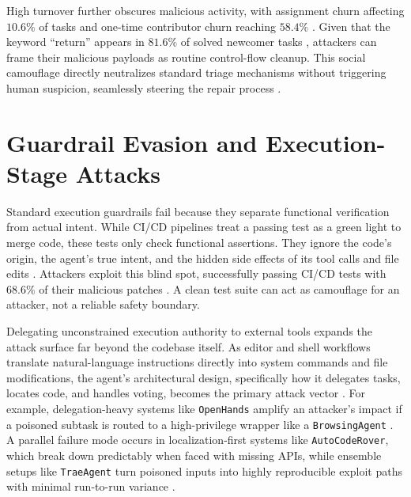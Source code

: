\documentclass[11pt, a4paper]{article}
\begin{document}
High turnover further obscures malicious activity, with assignment churn affecting $10.6\%$ of tasks and one-time contributor churn reaching $58.4\%$ \citep{good_first_issues_2020,ai_teammates_2025}. Given that the keyword ``return'' appears in $81.6\%$ of solved newcomer tasks \citep{good_first_issues_2020,adv_bug_reports_2026}, attackers can frame their malicious payloads as routine control-flow cleanup. This social camouflage directly neutralizes standard triage mechanisms without triggering human suspicion, seamlessly steering the repair process \citep{good_first_issues_2020,your_ai_my_shell_2025}.

\clearpage
\section{\textbf{Guardrail Evasion and Execution-Stage Attacks}}
\label{sec:guardrails}

Standard execution guardrails fail because they separate functional verification from actual intent. While CI/CD pipelines treat a passing test as a green light to merge code, these tests only check functional assertions. They ignore the code's origin, the agent's true intent, and the hidden side effects of its tool calls and file edits \citep{adv_bug_reports_2026,your_ai_my_shell_2025}. Attackers exploit this blind spot, successfully passing CI/CD tests with $68.6\%$ of their malicious patches \citep{adv_bug_reports_2026,swe_bench_2024}. A clean test suite can act as camouflage for an attacker, not a reliable safety boundary.

Delegating unconstrained execution authority to external tools expands the attack surface far beyond the codebase itself. As editor and shell workflows translate natural-language instructions directly into system commands and file modifications, the agent's architectural design, specifically how it delegates tasks, locates code, and handles voting, becomes the primary attack vector \citep{your_ai_my_shell_2025,swe_agent_2024}. For example, delegation-heavy systems like \texttt{OpenHands} amplify an attacker's impact if a poisoned subtask is routed to a high-privilege wrapper like a \texttt{BrowsingAgent} \citep{openhands_2025,agentic_coding_github_2026}. A parallel failure mode occurs in localization-first systems like \texttt{AutoCodeRover}, which break down predictably when faced with missing APIs, while ensemble setups like \texttt{TraeAgent} turn poisoned inputs into highly reproducible exploit paths with minimal run-to-run variance \citep{autocoderover_2024,trae_agent_2025}.
\end{document}
